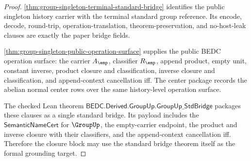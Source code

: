\begin{proof}
\autoref{thm:group-singleton-terminal-standard-bridge} identifies the public
singleton history carrier with the terminal standard group reference. Its
encode, decode, round-trip, operation-translation, theorem-preservation, and
no-host-leak clauses are exactly the paper bridge fields.

\autoref{thm:group-singleton-public-operation-surface} supplies the public BEDC
operation surface: the carrier $A_{\emp}$, classifier $R_{\emp}$, append
product, empty unit, constant inverse, product closure and classification,
inverse closure and classification, and append-context cancellation iff. The
center package records the abelian normal center rows over the same
history-level operation surface.

The checked Lean theorem
$\mathsf{BEDC.Derived.GroupUp.GroupUp\_StdBridge}$ packages these clauses as a
single standard bridge. Its payload includes the $\mathsf{SemanticNameCert}$
for $\GroupUp$, the empty-carrier endpoint, the product and inverse closure
with their classifiers, and the append-context cancellation iff. Therefore the
closure block may use the standard bridge theorem itself as the formal
grounding target.
\end{proof}
